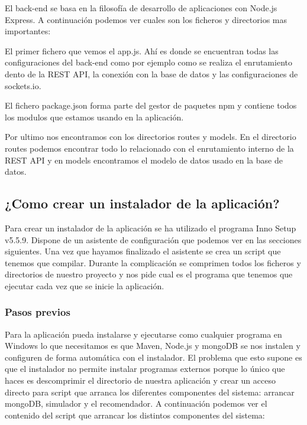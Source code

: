 El back-end se basa en la filosofía de desarrollo de aplicaciones con Node.js  Express. A continuación podemos ver cuales son los ficheros y directorios mas importantes:


El primer fichero que vemos el app.js. Ahí es donde se encuentran todas las configuraciones del back-end como por ejemplo como se realiza el enrutamiento dento de la REST API, la conexión con la base de datos y las configuraciones de sockets.io.

El fichero package.json forma parte del gestor de paquetes npm y contiene todos los modulos que estamos usando en la aplicación. 

Por ultimo nos encontramos con los directorios routes y models. En el directorio routes podemos encontrar todo lo relacionado con el enrutamiento interno de la REST API y en models encontramos el modelo de datos usado en la base de datos.

\subsection{¿Como crear un instalador de la aplicación?}

Para crear un instalador de la aplicación se ha utilizado el programa Inno Setup v5.5.9. Dispone de un asistente de configuración que podemos ver en las secciones siguientes. Una vez que hayamos finalizado el asistente se crea un script que tenemos que compilar. Durante la complicación se comprimen todos los ficheros y directorios de nuestro proyecto y nos pide cual es el programa que tenemos que ejecutar cada vez que se inicie la aplicación.

\subsubsection{Pasos previos}

Para la aplicación pueda instalarse y ejecutarse como cualquier programa en Windows lo que necesitamos es que Maven, Node.js y mongoDB se nos instalen y configuren de forma automática con el instalador. El problema que esto supone es que el instalador no permite instalar programas externos porque lo único que haces es descomprimir el directorio de nuestra aplicación y crear un acceso directo para script que arranca los diferentes componentes del sistema: arrancar mongoDB, simulador y el recomendador. A continuación podemos ver el contenido del script que arrancar los distintos componentes del sistema:

